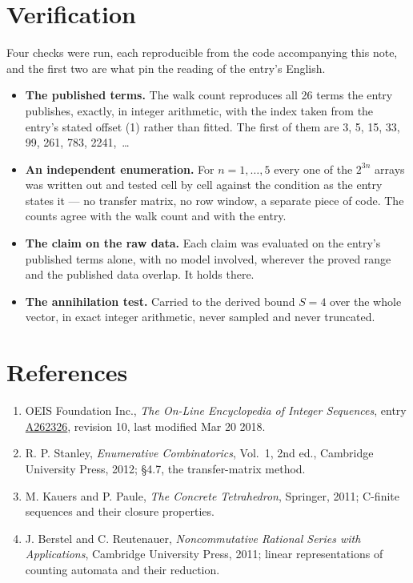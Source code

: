 \documentclass[11pt]{article}
\theoremstyle{definition}
\begin{document}
\section{Verification}

Four checks were run, each reproducible from the code accompanying this note, and the first two are what pin the reading of the entry's English.

\begin{itemize}

\item {\bfseries The published terms.} The walk count reproduces all 26 terms the entry publishes, exactly, in integer arithmetic, with the index taken from the entry's stated offset (1) rather than fitted. The first of them are 3, 5, 15, 33, 99, 261, 783, 2241,~\dots

\item {\bfseries An independent enumeration.} For $n = 1,\dots,5$ every one of the $2^{3n}$ arrays was written out and tested cell by cell against the condition as the entry states it --- no transfer matrix, no row window, a separate piece of code. The counts agree with the walk count and with the entry.

\item {\bfseries The claim on the raw data.} Each claim was evaluated on the entry's published terms alone, with no model involved, wherever the proved range and the published data overlap. It holds there.

\item {\bfseries The annihilation test.} Carried to the derived bound $S = 4$ over the whole vector, in exact integer arithmetic, never sampled and never truncated.

\end{itemize}

\section{References}

\begin{enumerate}

\item OEIS Foundation Inc., \emph{The On-Line Encyclopedia of Integer Sequences}, entry \href{https://oeis.org/A262326}{A262326}, revision 10, last modified Mar 20 2018.

\item R. P. Stanley, \emph{Enumerative Combinatorics}, Vol.~1, 2nd ed., Cambridge University Press, 2012; \S4.7, the transfer-matrix method.

\item M. Kauers and P. Paule, \emph{The Concrete Tetrahedron}, Springer, 2011; C-finite sequences and their closure properties.

\item J. Berstel and C. Reutenauer, \emph{Noncommutative Rational Series with Applications}, Cambridge University Press, 2011; linear representations of counting automata and their reduction.

\end{enumerate}
\end{document}
